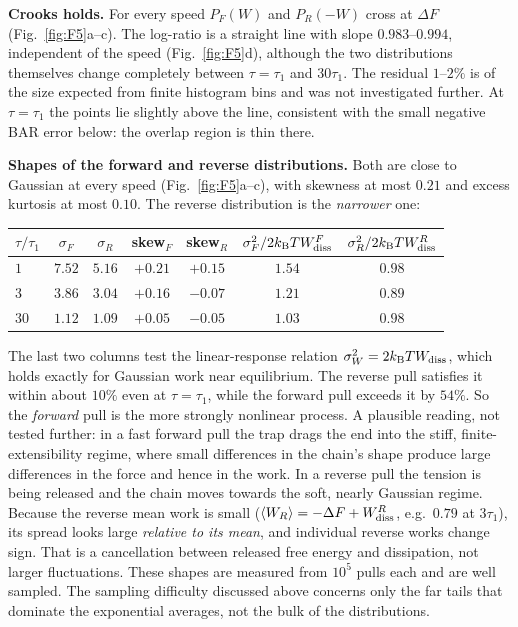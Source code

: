 \documentclass[11pt,a4paper]{article}
\newcommand{\kT}{k_{\mathrm B}T}
\newcommand{\avg}[1]{\left\langle #1\right\rangle}
\newcommand{\Wd}{W_{\rm diss}}
\begin{document}
\noindent\textbf{Crooks holds.} For every speed $P_F(W)$ and $P_R(-W)$ cross at $\Delta F$
(Fig.~\ref{fig:F5}a--c). The log-ratio is a straight line with slope $0.983$--$0.994$, independent
of the speed (Fig.~\ref{fig:F5}d), although the two distributions themselves change completely between
$\tau=\tau_1$ and $30\tau_1$. The residual $1$--$2\%$ is of the size expected from finite histogram bins and was
not investigated further. At $\tau=\tau_1$ the points lie slightly above the line, consistent with
the small negative BAR error below: the overlap region is thin there.

\noindent\textbf{Shapes of the forward and reverse distributions.} Both are close to Gaussian at
every speed (Fig.~\ref{fig:F5}a--c), with skewness at most $0.21$ and excess kurtosis at most $0.10$.
The reverse distribution is the \emph{narrower} one:
\begin{center}\small
\begin{tabular}{lcccccc}
\toprule
$\tau/\tau_1$ & $\sigma_F$ & $\sigma_R$ & skew$_F$ & skew$_R$ & $\sigma_F^2/2\kT\Wd^F$ & $\sigma_R^2/2\kT\Wd^R$\\
\midrule
$1$ & $7.52$ & $5.16$ & $+0.21$ & $+0.15$ & $1.54$ & $0.98$\\
$3$ & $3.86$ & $3.04$ & $+0.16$ & $-0.07$ & $1.21$ & $0.89$\\
$30$ & $1.12$ & $1.09$ & $+0.05$ & $-0.05$ & $1.03$ & $0.98$\\
\bottomrule
\end{tabular}
\end{center}
The last two columns test the linear-response relation $\sigma_W^2=2\kT\Wd$, which holds exactly for
Gaussian work near equilibrium. The reverse pull satisfies it within about $10\%$ even at $\tau=\tau_1$,
while the forward pull exceeds it by $54\%$. So the \emph{forward} pull is the more strongly
nonlinear process. A plausible reading, not tested further: in a fast forward pull the trap drags the
end into the stiff, finite-extensibility regime, where small differences in the chain's shape produce
large differences in the force and hence in the work. In a reverse pull the tension is being released
and the chain moves towards the soft, nearly Gaussian regime. Because the reverse mean work is small
($\avg{W_R}=-\Delta F+\Wd^R$, e.g.\ $0.79$ at $3\tau_1$), its spread looks large \emph{relative to its
mean}, and individual reverse works change sign. That is a cancellation between released free energy
and dissipation, not larger fluctuations. These shapes are measured from $10^5$ pulls each and are well
sampled. The sampling difficulty discussed above concerns only the far tails that dominate the
exponential averages, not the bulk of the distributions.
\end{document}
